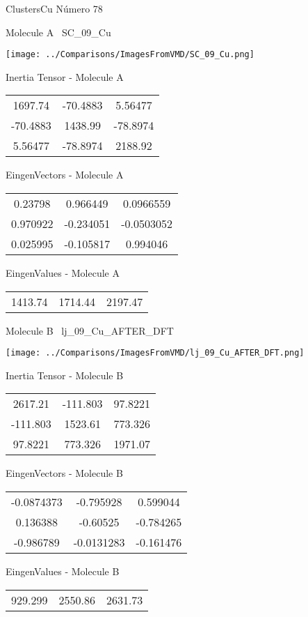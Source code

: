 \vtab[-3cm]
\begin{center}
{\large ClustersCu \tab Número 78}
\end{center}
\begin{multicols}{2}
\begin{center}

Molecule A \
SC\_09\_Cu

\texttt{[image: ../Comparisons/ImagesFromVMD/SC\_09\_Cu.png]}

Inertia Tensor - Molecule A \\
\begin{tabular}{|c c c|}
1697.74	 & 	-70.4883	 & 	5.56477	 \\
-70.4883	 & 	1438.99	 & 	-78.8974	 \\
5.56477	 & 	-78.8974	 & 	2188.92
\end{tabular}

\vtab
 EingenVectors - Molecule A     \\
\begin{tabular}{|c c c|}
0.23798	 & 	0.966449	 & 	0.0966559	 \\
0.970922	 & 	-0.234051	 & 	-0.0503052	 \\
0.025995	 & 	-0.105817	 & 	0.994046
\end{tabular}

\vtab
 EingenValues - Molecule A     \\
\begin{tabular}{|c c c|}
1413.74	 & 	1714.44	 & 	2197.47	 \\
\end{tabular}
\columnbreak

Molecule B \
lj\_09\_Cu\_AFTER\_DFT

\texttt{[image: ../Comparisons/ImagesFromVMD/lj\_09\_Cu\_AFTER\_DFT.png]}

Inertia Tensor - Molecule B \\
\begin{tabular}{|c c c|}
2617.21	 & 	-111.803	 & 	97.8221	 \\
-111.803	 & 	1523.61	 & 	773.326	 \\
97.8221	 & 	773.326	 & 	1971.07
\end{tabular}

\vtab
 EingenVectors - Molecule B     \\
\begin{tabular}{|c c c|}
-0.0874373	 & 	-0.795928	 & 	0.599044	 \\
0.136388	 & 	-0.60525	 & 	-0.784265	 \\
-0.986789	 & 	-0.0131283	 & 	-0.161476
\end{tabular}

\vtab
 EingenValues - Molecule B     \\
\begin{tabular}{|c c c|}
929.299	 & 	2550.86	 & 	2631.73	 \\
\end{tabular}

\end{center}
\end{multicols}

